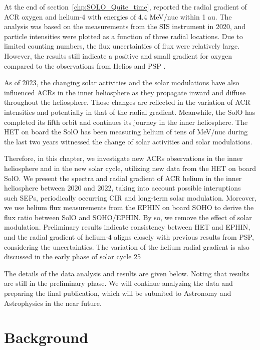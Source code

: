 At the end of section~\ref{chp:SOLO_Quite_time}, \citet{Mason-2021-SolOQuietTime} reported the radial gradient of \ac{ACR} oxygen and helium-4 with energies of 4.4 MeV/nuc within 1 au. The analysis was based on the measurements from the \ac{SIS} instrument in 2020, and particle intensities were plotted as a function of three radial locations. Due to limited counting numbers, the flux uncertainties of flux were relatively large. However, the results still indicate a positive and small gradient for oxygen compared to the observations from Helios and \ac{PSP} \citep{Rankin2021ApJ,Marquardt2018AA}.

As of 2023, the changing solar activities and the solar modulations have also influenced \acp{ACR} in the inner heliosphere as they propagate inward and diffuse throughout the heliosphere. Those changes are reflected in the variation of \ac{ACR} intensities and potentially in that of the radial gradient.
Meanwhile, the \ac{SolO} has completed its fifth orbit and continues its journey in the inner heliosphere. The \ac{HET} on board the \ac{SolO} has been measuring helium of tens of MeV/nuc during the last two years witnessed the change of solar activities and solar modulations.

Therefore, in this chapter, we investigate new \acp{ACR} observations in the inner heliosphere and in the new solar cycle, utilizing new data from the \ac{HET} on board \ac{SolO}. We present the spectra and radial gradient of \ac{ACR} helium in the inner heliosphere between 2020 and 2022, taking into account possible interuptions such \acp{SEP}, periodically occurring \ac{CIR} and long-term solar modulation. Moreover, we use helium flux measurements from the \ac{EPHIN} on board \ac{SOHO} to derive the flux ratio between \ac{SolO} and \ac{SOHO}/\ac{EPHIN}. By so, we remove the effect of solar modulation. Preliminary results indicate consistency between \ac{HET} and \ac{EPHIN}, and the radial gradient of helium-4 aligns closely with previous results from \ac{PSP}, considering the uncertainties. The variation of the helium radial gradient is also discussed in the early phase of solar cycle 25

The details of the data analysis and results are given below. Noting that results are still in the preliminary phase. We will continue analyzing the data and preparing the final publication, which will be submited to Astronomy and Astrophysics in the near future.


\section{Background}

